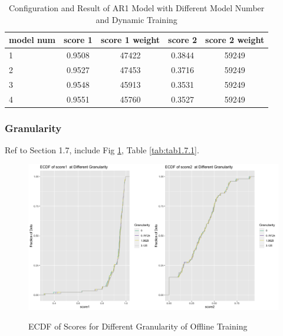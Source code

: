 \documentclass{article}
\begin{document}
\begin{table}[htbp]
  \begin{center}
    \caption{Configuration and Result of AR1 Model with Different Model Number and Dynamic Training}
    \label{tab:tab1.6.2}
    \begin{tabular}{l|*{4}{c}}
      \textbf{model num} & \textbf{score 1} & \textbf{score 1 weight} & \textbf{score 2} & \textbf{score 2 weight} \\
      \hline
      1 & 0.9508 & 47422 & 0.3844 & 59249\\
      2 & 0.9527 & 47453 & 0.3716 & 59249\\
      3 & 0.9548 & 45913 & 0.3531 & 59249\\
      4 & 0.9551 & 45760 & 0.3527 & 59249\\
    \end{tabular}
  \end{center}
\end{table}

\subsubsection{Granularity}
Ref to Section 1.7, include Fig \ref{fig:fig1.7.1}, Table \ref{tab:tab1.7.1}.

\begin{figure}
    \caption{ECDF of Scores for Different Granularity of Offline Training}
    \centering
    \includegraphics{images/ECDFofscoresatDifferentGranularityOfAR1,840,3,1.png}
    \label{fig:fig1.7.1}
\end{figure}
\end{document}
